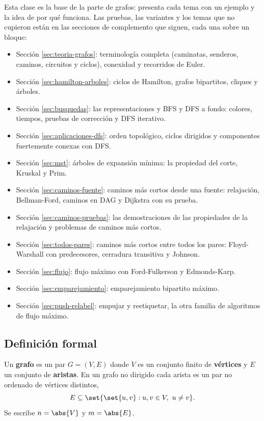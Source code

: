 \documentclass[11pt,letterpaper]{article}
\begin{document}
Esta clase es la base de la parte de grafos: presenta cada tema con
un ejemplo y la idea de por qué funciona. Las pruebas, las variantes y
los temas que no cupieron están en las secciones de complemento que
siguen, cada una sobre un bloque:
\begin{itemize}[itemsep=0.1em]
  \item Sección \ref{sec:teoria-grafos}: terminología completa
        (caminatas, senderos, caminos, circuitos y ciclos), conexidad
        y recorridos de Euler.
  \item Sección \ref{sec:hamilton-arboles}: ciclos de Hamilton,
        grafos bipartitos, cliques y árboles.
  \item Sección \ref{sec:busquedas}: las representaciones y BFS y DFS
        a fondo: colores, tiempos, pruebas de corrección y DFS
        iterativo.
  \item Sección \ref{sec:aplicaciones-dfs}: orden topológico, ciclos
        dirigidos y componentes fuertemente conexas con DFS.
  \item Sección \ref{sec:mst}: árboles de expansión mínima: la
        propiedad del corte, Kruskal y Prim.
  \item Sección \ref{sec:caminos-fuente}: caminos más cortos desde una
        fuente: relajación, Bellman-Ford, caminos en DAG y Dijkstra
        con su prueba.
  \item Sección \ref{sec:caminos-pruebas}: las demostraciones de las
        propiedades de la relajación y problemas de caminos más
        cortos.
  \item Sección \ref{sec:todos-pares}: caminos más cortos entre todos
        los pares: Floyd-Warshall con predecesores, cerradura
        transitiva y Johnson.
  \item Sección \ref{sec:flujo}: flujo máximo con Ford-Fulkerson y
        Edmonds-Karp.
  \item Sección \ref{sec:emparejamiento}: emparejamiento bipartito
        máximo.
  \item Sección \ref{sec:push-relabel}: empujar y reetiquetar, la otra
        familia de algoritmos de flujo máximo.
\end{itemize}

\subsection*{Definición formal}

\begin{definicion}[Grafo]
  Un \textbf{grafo} es un par $G = (V, E)$ donde $V$ es un conjunto
  finito de \textbf{vértices} y $E$ un conjunto de \textbf{aristas}.
  En un grafo no dirigido cada arista es un par no ordenado de
  vértices distintos,
  \[
    E \subseteq \set{\set{u, v} : u, v \in V,\ u \neq v} .
  \]
  Se escribe $n = \abs{V}$ y $m = \abs{E}$.
\end{definicion}
\end{document}
